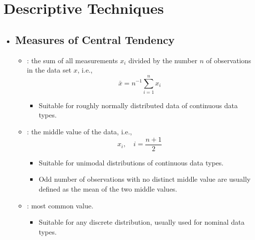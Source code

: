 \section{Descriptive Techniques}
\begin{itemize}
  \item[]

  \subsection{Measures of Central Tendency}
  \begin{itemize}
    \item {}: the sum of all measurements \(x_i\) divided by the number \(n\) of observations in the data set \(x\), i.e.,
    \[%
    \bar{x}= n ^{-1}\sum_{i=1}^{n}x_i
    \]%
    \begin{itemize}
      \item Suitable for roughly normally distributed data of continuous data types.
    \end{itemize}
    \item {}: the middle value of the data, i.e.,
    \[%
    x_i,\quad i=\frac{n+1}{2}
    \]%
    \begin{itemize}
      \item Suitable for unimodal distributions of continuous data types.
      \item Odd number of observations with no distinct middle value are usually defined as the mean of the two middle values.
    \end{itemize}
    \item {}: most common value.
      \begin{itemize}
        \item Suitable for any discrete distribution, usually used for nominal data types.
      \end{itemize}
  \end{itemize}


\end{itemize}
